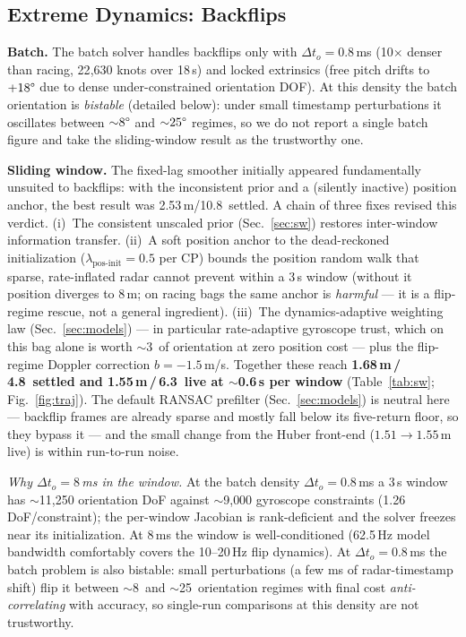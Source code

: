 \documentclass[conference]{IEEEtran}
\begin{document}
\subsection{Extreme Dynamics: Backflips}
\label{sec:backflips}

\textbf{Batch.}
The batch solver handles backflips only with $\Delta t_o {=} 0.8$\,ms
(10$\times$ denser than racing, 22{,}630 knots over 18\,s) and
locked extrinsics (free pitch drifts to $+18\degree$ due to dense
under-constrained orientation DOF).  At this density the batch
orientation is \emph{bistable} (detailed below): under small timestamp
perturbations it oscillates between ${\sim}8\degree$ and
${\sim}25\degree$ regimes, so we do not report a single batch figure and
take the sliding-window result as the trustworthy one.

\textbf{Sliding window.}
The fixed-lag smoother initially appeared fundamentally unsuited to
backflips: with the inconsistent prior and a (silently inactive)
position anchor, the best result was 2.53\,m/10.8\degree\ settled.
A chain of three fixes revised this verdict.
(i)~The consistent unscaled prior (Sec.~\ref{sec:sw}) restores
inter-window information transfer.
(ii)~A soft position anchor to the dead-reckoned initialization
($\lambda_{\mathrm{pos\text{-}init}}{=}0.5$ per CP) bounds the
position random walk that sparse, rate-inflated radar cannot prevent
within a 3\,s window (without it position diverges to 8\,m; on racing
bags the same anchor is \emph{harmful} --- it is a flip-regime rescue,
not a general ingredient).
(iii)~The dynamics-adaptive weighting law (Sec.~\ref{sec:models}) ---
in particular rate-adaptive gyroscope trust, which on this bag alone
is worth $\sim$3\degree\ of orientation at zero position cost ---
plus the flip-regime Doppler correction $b{=}{-}1.5$\,m/s.
Together these reach \textbf{1.68\,m\,/\,4.8\degree\ settled and
1.55\,m\,/\,6.3\degree\ live at $\sim$0.6\,s per window}
(Table~\ref{tab:sw}; Fig.~\ref{fig:traj}).  The default RANSAC
prefilter (Sec.~\ref{sec:models})
is neutral here --- backflip frames are already sparse and mostly fall
below its five-return floor, so they bypass it --- and the small change
from the Huber front-end ($1.51\to1.55$\,m live) is within run-to-run
noise.

\emph{Why $\Delta t_o{=}8$\,ms in the window.}
At the batch density $\Delta t_o{=}0.8$\,ms a 3\,s window has
$\sim$11{,}250 orientation DoF against $\sim$9{,}000 gyroscope
constraints (1.26 DoF/constraint); the per-window Jacobian is
rank-deficient and the solver freezes near its initialization.
At 8\,ms the window is well-conditioned (62.5\,Hz model bandwidth
comfortably covers the 10--20\,Hz flip dynamics).
At $\Delta t_o{=}0.8$\,ms the batch problem is also bistable: small
perturbations (a few ms of radar-timestamp shift) flip it between
$\sim$8\degree\ and $\sim$25\degree\ orientation regimes with final cost
\emph{anti-correlating} with accuracy, so single-run comparisons at this
density are not trustworthy.
\end{document}
